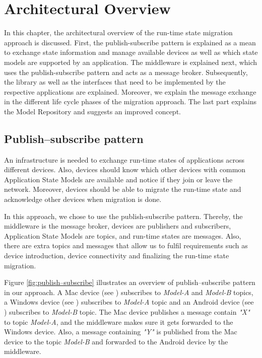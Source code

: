 \chapter{Architectural Overview}
\label{ch:architectural_overview}
In this chapter, the architectural overview of the run-time state migration approach is discussed. First, the publish-subscribe pattern is explained as a mean to exchange state information and manage available devices as well as which state models are supported by an application. The middleware is explained next, which uses the publish-subscribe pattern and acts as a message broker. Subsequently, the library as well as the interfaces that need to be implemented by the respective applications are explained. Moreover, we explain the message exchange in the different life cycle phases of the migration approach. The last part explains the Model Repository and suggests an improved concept.

\section{Publish–subscribe pattern}
An infrastructure is needed to exchange run-time states of applications across different devices. Also, devices should know which other devices with common Application State Models are available and notice if they join or leave the network. Moreover, devices should be able to migrate the run-time state and acknowledge other devices when migration is done.

In this approach, we chose to use the publish-subscribe pattern. Thereby, the middleware is the message broker, devices are publishers and subscribers, Application State Models are topics, and run-time states are messages. Also, there are extra topics and messages that allow us to fulfil requirements such as device introduction, device connectivity and finalizing the run-time state migration.

Figure \ref{fig:publish–subscribe} illustrates an overview of publish–subscribe pattern in our approach. A Mac device (see \fcircone) subscribes to \textit{Model-A} and \textit{Model-B} topics, a Windows device (see \fcirctwo) subscribes to \textit{Model-A} topic and an Android device (see \fcircthree) subscribes to \textit{Model-B} topic. The Mac device publishes a message contain \textit{"X"} to topic \textit{Model-A}, and the middleware makes sure it gets forwarded to the Windows device. Also, a message containing \textit{"Y"} is published from the Mac device to the topic \textit{Model-B} and forwarded to the Android device by the middleware.

